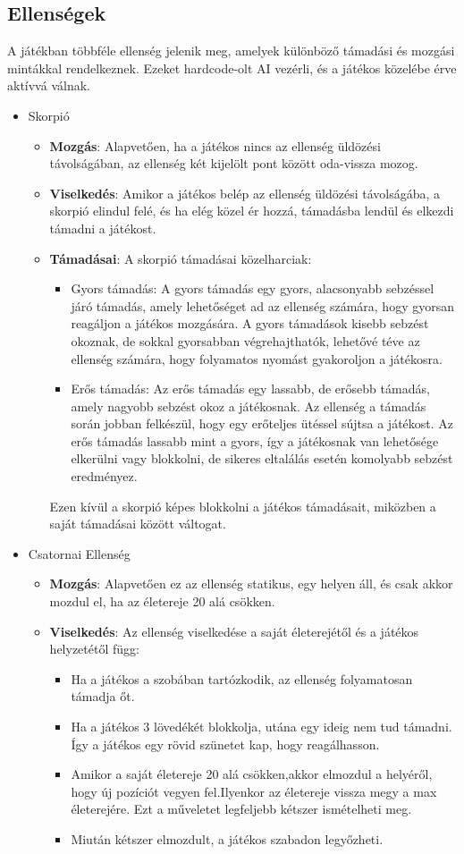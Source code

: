 \documentclass[
]{thesis-ekf}
\theoremstyle{definition}
\theoremstyle{remark}
\begin{document}
\subsection{Ellenségek}

A játékban többféle ellenség jelenik meg, amelyek különböző támadási és mozgási mintákkal rendelkeznek. Ezeket hardcode-olt AI vezérli, és a játékos közelébe érve aktívvá válnak.
\begin{itemize}
	\item Skorpió
	\begin{itemize}
		\item \textbf{Mozgás}: Alapvetően, ha a játékos nincs az ellenség üldözési távolságában, az ellenség két kijelölt pont között oda-vissza mozog.
		\item \textbf{Viselkedés}: Amikor a játékos belép az ellenség üldözési távolságába, a skorpió elindul felé, és ha elég közel ér hozzá, támadásba lendül és elkezdi támadni a játékost.
		\item \textbf{Támadásai}: A skorpió támadásai közelharciak:
		\begin{itemize}
			\item Gyors támadás: A gyors támadás egy gyors, alacsonyabb sebzéssel járó támadás, amely lehetőséget ad az ellenség számára, hogy gyorsan reagáljon a játékos mozgására. A gyors támadások kisebb sebzést okoznak, de sokkal gyorsabban végrehajthatók, lehetővé téve az ellenség számára, hogy folyamatos nyomást gyakoroljon a játékosra. 
			\item Erős támadás: Az erős támadás egy lassabb, de erősebb támadás, amely nagyobb sebzést okoz a játékosnak. Az ellenség a támadás során jobban felkészül, hogy egy erőteljes ütéssel sújtsa a játékost. Az erős támadás lassabb mint a gyors, így a játékosnak van lehetősége elkerülni vagy blokkolni, de sikeres eltalálás esetén komolyabb sebzést eredményez.
		\end{itemize}
		Ezen kívül a skorpió képes blokkolni a játékos támadásait, miközben a saját támadásai között váltogat.
	\end{itemize}
	\item Csatornai Ellenség
	\begin{itemize}
		\item \textbf{Mozgás}: Alapvetően ez az ellenség statikus, egy helyen áll, és csak akkor mozdul el, ha az életereje 20 alá csökken.
		\item \textbf{Viselkedés}: Az ellenség viselkedése a saját életerejétől és a játékos helyzetétől függ:
		\begin{itemize}
			\item Ha a játékos a szobában tartózkodik, az ellenség folyamatosan támadja őt.
			\item Ha a játékos 3 lövedékét blokkolja, utána egy ideig nem tud támadni. Így a játékos egy rövid szünetet kap, hogy reagálhasson.
			\item Amikor a saját életereje 20 alá csökken,akkor elmozdul a helyéről, hogy új pozíciót vegyen fel.Ilyenkor az életereje vissza megy a max életerejére. Ezt a műveletet legfeljebb kétszer ismételheti meg.
			\item Miután kétszer elmozdult, a játékos szabadon legyőzheti.
			

\end{itemize}
\end{itemize}
\end{itemize}
\end{document}
